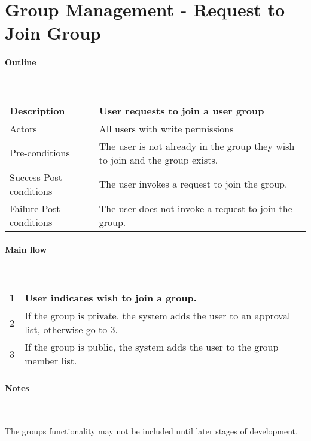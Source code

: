 \section*{Group Management - Request to Join Group} %

\paragraph*{Outline} \

\begin{tabular}{ | l | l | }
\hline
Description & User requests to join a user group \\ \hline
Actors & All users with write permissions \\ \hline
Pre-conditions & The user is not already in the group they wish to join and the group exists. \\ \hline
Success Post-conditions & The user invokes a request to join the group. \\ \hline
Failure Post-conditions & The user does not invoke a request to join the group. \\ \hline
\end{tabular}


\paragraph*{Main flow} \

\begin{tabular}{ | l | l | } \hline
1 & User indicates wish to join a group. \\ \hline
2 & If the group is private, the system adds the user to an approval list, otherwise go to 3. \\ \hline
3 & If the group is public, the system adds the user to the group member list. \\ \hline
\end{tabular}

\paragraph*{Notes} \

The groups functionality may not be included until later stages of development.
